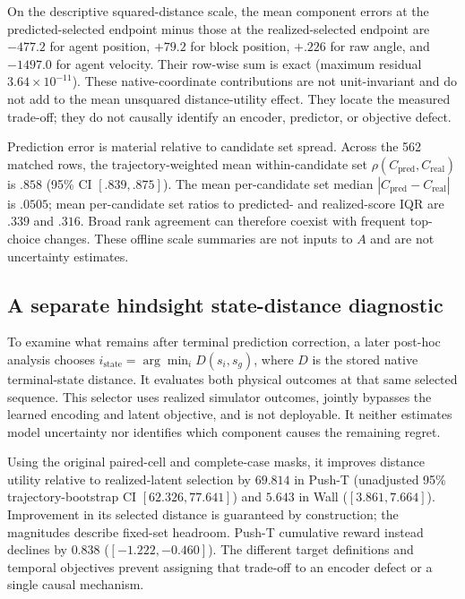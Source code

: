 \documentclass{article}
\begin{document}
On the descriptive squared-distance scale, the mean component errors at the
predicted-selected endpoint minus those at the realized-selected endpoint
are $-477.2$ for agent position, $+79.2$ for block position,
$+.226$ for raw angle, and $-1497.0$ for agent velocity. Their row-wise sum
is exact (maximum residual $3.64\times10^{-11}$). These native-coordinate
contributions are not unit-invariant and do not add to the mean unsquared
distance-utility effect. They locate the measured trade-off; they do not causally identify
an encoder, predictor, or objective defect.

Prediction error is material relative to candidate set spread. Across the 562 matched
rows, the trajectory-weighted mean within-candidate set $\rho(C_{\mathrm{pred}},C_{\mathrm{real}})$ is $.858$
(95\% CI $[.839,.875]$). The mean per-candidate set median $|C_{\mathrm{pred}}-C_{\mathrm{real}}|$ is $.0505$;
mean per-candidate set ratios to predicted- and realized-score IQR are $.339$ and
$.316$. Broad rank agreement can therefore coexist with frequent top-choice
changes. These offline scale summaries are not inputs to $A$ and are not
uncertainty estimates.

\subsection{A separate hindsight state-distance diagnostic}
\label{sec:state}

To examine what remains after terminal prediction correction, a later post-hoc
analysis chooses $i_{\mathrm{state}}=\arg\min_i D(s_i,s_g)$, where $D$ is the
stored native terminal-state distance. It evaluates both physical outcomes
at that same selected sequence. This selector uses realized simulator outcomes,
jointly bypasses the learned encoding and latent objective, and is not
deployable. It neither estimates model uncertainty nor identifies which
component causes the remaining regret.

Using the original paired-cell and complete-case masks, it improves distance
utility relative to realized-latent selection by $69.814$ in Push-T
(unadjusted 95\% trajectory-bootstrap CI $[62.326,77.641]$) and $5.643$ in
Wall ($[3.861,7.664]$). Improvement in its selected distance is guaranteed by
construction; the magnitudes describe fixed-set headroom. Push-T cumulative
reward instead declines by $0.838$ ($[-1.222,-0.460]$). The different target
definitions and temporal objectives prevent assigning that trade-off to an
encoder defect or a single causal mechanism.
\end{document}
